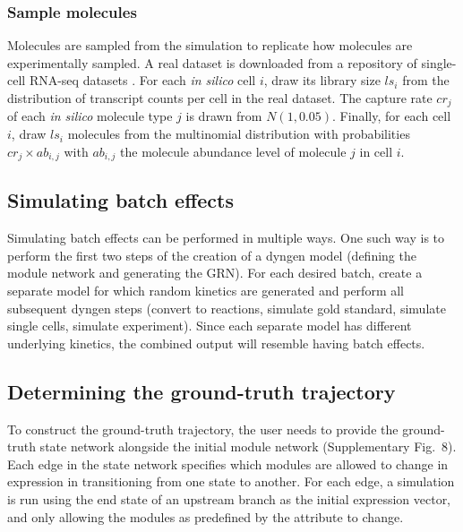 \documentclass[
  table,
  10pt,
  a4paper]{article}
\begin{document}
\hypertarget{sample-molecules}{%
\subsubsection{Sample molecules}\label{sample-molecules}}

Molecules are sampled from the simulation to replicate how molecules are
experimentally sampled. A real dataset is downloaded from a repository
of single-cell RNA-seq datasets
\autocite{cannoodt_singlecellomicsdatasets_2018}. For each \emph{in
silico} cell \(i\), draw its library size \(ls_i\) from the distribution
of transcript counts per cell in the real dataset. The capture rate
\(cr_j\) of each \emph{in silico} molecule type \(j\) is drawn from
\(N(1, 0.05)\). Finally, for each cell \(i\), draw \(ls_i\) molecules
from the multinomial distribution with probabilities
\(cr_j \times ab_{i,j}\) with \(ab_{i,j}\) the molecule abundance level
of molecule \(j\) in cell \(i\).

\hypertarget{sec:dyngen-batcheffect}{%
\subsection{Simulating batch effects}\label{sec:dyngen-batcheffect}}

Simulating batch effects can be performed in multiple ways. One such way
is to perform the first two steps of the creation of a dyngen model
(defining the module network and generating the GRN). For each desired
batch, create a separate model for which random kinetics are generated
and perform all subsequent dyngen steps (convert to reactions, simulate
gold standard, simulate single cells, simulate experiment). Since each
separate model has different underlying kinetics, the combined output
will resemble having batch effects.

\hypertarget{sec:dyngen-groundtruth}{%
\subsection{Determining the ground-truth
trajectory}\label{sec:dyngen-groundtruth}}

To construct the ground-truth trajectory, the user needs to provide the
ground-truth state network alongside the initial module network
(Supplementary Fig.~8). Each edge in the state network specifies which
modules are allowed to change in expression in transitioning from one
state to another. For each edge, a simulation is run using the end state
of an upstream branch as the initial expression vector, and only
allowing the modules as predefined by the attribute to change.
\end{document}
